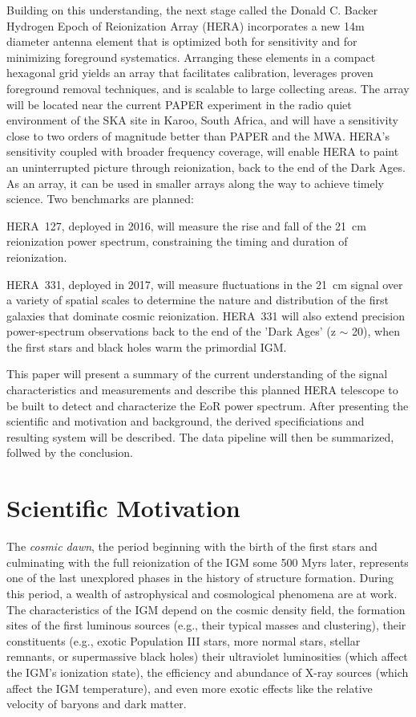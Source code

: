 \documentclass[ars]{copernicus}
\begin{document}
Building on this understanding, the next stage called the Donald C. Backer Hydrogen Epoch of Reionization Array (HERA) incorporates a new
14m diameter antenna element that is optimized both for sensitivity
and for minimizing foreground systematics.  Arranging these elements
in a compact hexagonal grid yields an array that facilitates
calibration, leverages proven foreground removal techniques, and is
scalable to large collecting areas. The array will be located near the current PAPER
experiment
in the radio quiet environment of the SKA site in Karoo, South Africa,
and will have a sensitivity close to two orders of magnitude better than
PAPER and the MWA.  HERA's sensitivity coupled with broader frequency coverage, 
will enable HERA to paint an
uninterrupted picture through reionization, back to the end of the
Dark Ages.  As an array, it can be used in smaller arrays along the way to 
achieve timely science.  Two benchmarks are planned:

HERA~127, deployed in 2016, will measure the rise and fall of the
21~cm reionization power spectrum, constraining the timing and
duration of reionization.

HERA~331, deployed in 2017, will measure fluctuations in the 21~cm
signal over a variety of spatial scales to determine the nature and
distribution of the first galaxies that dominate cosmic
reionization. HERA~331 will also extend precision power-spectrum
observations back to the end of the 'Dark Ages' (z $\sim$ 20), when
the first stars and black holes warm the primordial IGM.

This paper will present a summary of the current understanding
of the signal characteristics and measurements and describe this planned
HERA telescope to be built to detect and characterize the EoR power
spectrum.  After presenting the scientific and motivation and background, the
derived specificiations and resulting system will be described.  The data pipeline
will then be summarized, follwed by the conclusion.

\section{Scientific Motivation}
\label{sec:science}

The {\it cosmic dawn}, the period beginning with the birth of the first stars and
culminating with the full reionization of the IGM some 500 Myrs later, represents one
of the last unexplored phases in the history of structure formation. During this
period, a wealth of astrophysical and cosmological phenomena are at work. The
characteristics of the IGM depend on the cosmic density field, the formation sites of
the first luminous sources (e.g., their typical masses and clustering), their
constituents (e.g., exotic Population III stars, more normal stars, stellar remnants,
or supermassive black holes) their ultraviolet luminosities (which affect the IGM's
ionization state), the efficiency and abundance of X-ray sources (which affect the
IGM temperature), and even more exotic effects like the relative velocity of baryons
and dark matter.
\end{document}
